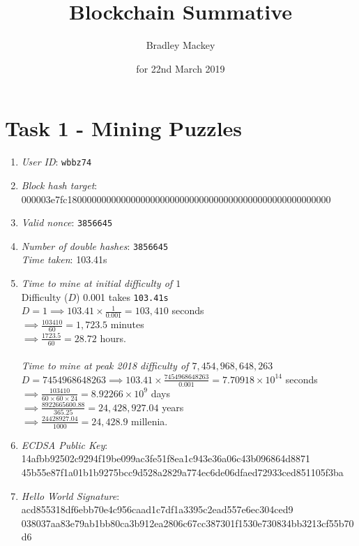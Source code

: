 \documentclass[11pt]{article}
\begin{document}
\title{\textbf{Blockchain Summative}}
\date{for 22nd March 2019}
\author{Bradley Mackey}
\maketitle


\section*{Task 1 - Mining Puzzles}

\begin{enumerate}
\item \textit{User ID}: \texttt{wbbz74}
\item \textit{Block hash target}: 000003e7fc180000000000000000000000000000000000000000000000000000
\item \textit{Valid nonce}: \texttt{3856645}
\item \textit{Number of double hashes}: \texttt{3856645}\\\textit{Time taken}: 103.41s
\item 
\textit{Time to mine at initial difficulty of $1$}\\
Difficulty ($D$) 0.001 takes \texttt{103.41s}\\
$D=1 \implies 103.41\times{\frac{1}{0.001}}=103,410$ seconds\\
$\implies \frac{103410}{60}=1,723.5$ minutes\\
$\implies \frac{1723.5}{60}=28.72$ hours.\\
\\
\textit{Time to mine at peak 2018 difficulty of $7,454,968,648,263$}\\
$D=7454968648263 \implies 103.41\times{\frac{7454968648263}{0.001}}=7.70918\times10^{14}$ seconds\\
$\implies \frac{103410}{60\times60\times24}=8.92266\times10^{9}$ days\\
$\implies \frac{8922665600.88}{365.25}=24,428,927.04$ years\\
$\implies \frac{24428927.04}{1000}=24,428.9$ millenia.\\

\item \textit{ECDSA Public Key}: 14afbb92502c9294f19be099ac3fe51f8ea1c943e36a06c43b096864d8871\\
45b55e87f1a01b1b9275bcc9d528a2829a774ec6de06dfaed72933ced851105f3ba

\item \textit{Hello World Signature}: acd855318df6ebb70e4c956caad1c7df1a3395c2ead557e6ec304ced9\\ 038037aa83e79ab1bb80ca3b912ea2806c67cc387301f1530e730834bb3213cf55b70d6


\end{enumerate}
\end{document}
